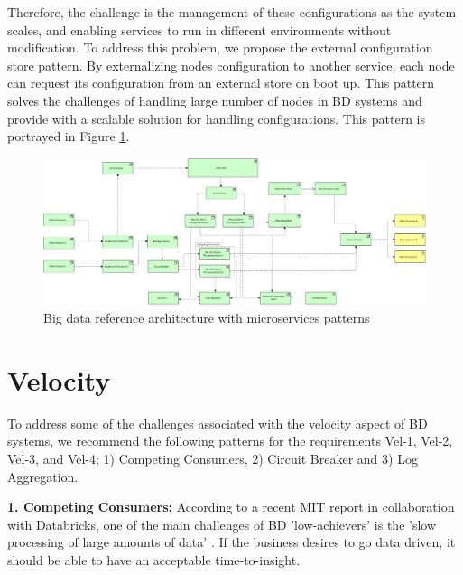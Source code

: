 \documentclass[a4paper,11pt,article,oneside]{memoir}
\begin{document}
Therefore, the challenge is the management of these configurations as the system scales, and enabling services to run in different environments without modification. To address this problem, we propose the external configuration store pattern. By externalizing nodes configuration to another service, each node can request its configuration from an external store on boot up. This pattern solves the challenges of handling large number of nodes in BD systems and provide with a scalable solution for handling configurations. This pattern is portrayed in Figure \ref{fig:RA}.

\begin{figure}[h]
    \centering 
    \includegraphics[width=16.5cm]{Media/All together.jpg}
    \caption{Big data reference architecture with microservices patterns}
    \label{fig:RA}
\end{figure}

\section{Velocity}

To address some of the challenges associated with the velocity aspect of BD systems, we recommend the following patterns for the requirements Vel-1, Vel-2, Vel-3, and Vel-4; 1) Competing Consumers, 2) Circuit Breaker and 3) Log Aggregation.

\vspace{6px}
\textbf{1. Competing Consumers:} According to a recent MIT report in collaboration with Databricks, one of the main challenges of BD 'low-achievers' is the 'slow processing of large amounts of data' \citep{DataBricksSurvey}. If the business desires to go data driven, it should be able to have an acceptable time-to-insight. 

\end{document}
